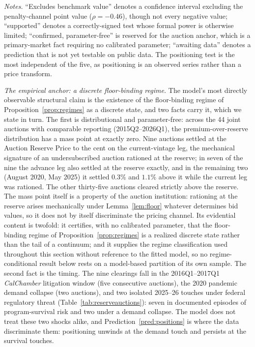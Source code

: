 \documentclass[11pt,letterpaper]{article}
\theoremstyle{plain}
\theoremstyle{definition}
\numberwithin{equation}{section}
\begin{document}
\begin{table}[H]
\smallskip
{\footnotesize\justifying
\textit{Notes.} ``Excludes benchmark value'' denotes a confidence interval excluding the penalty-channel point value ($\rho=-0.46$), though not every negative value; ``supported'' denotes a correctly-signed test whose formal power is otherwise limited; ``confirmed, parameter-free'' is reserved for the auction anchor, which is a primary-market fact requiring no calibrated parameter; ``awaiting data'' denotes a prediction that is not yet testable on public data. The positioning test is the most independent of the five, as positioning is an observed series rather than a price transform.\par}
\end{table}

\emph{The empirical anchor: a discrete floor-binding regime.} The model's most directly observable structural claim is the existence of the floor-binding regime of Proposition~\ref{prop:regimes} as a discrete state, and two facts carry it, which we state in turn. The first is distributional and parameter-free: across the 44 joint auctions with comparable reporting (2015Q2--2026Q1), the premium-over-reserve distribution has a mass point at exactly zero. Nine auctions settled at the Auction Reserve Price to the cent on the current-vintage leg, the mechanical signature of an undersubscribed auction rationed at the reserve; in seven of the nine the advance leg also settled at the reserve exactly, and in the remaining two (August 2020, May 2025) it settled $0.3\%$ and $1.1\%$ above it while the current leg was rationed. The other thirty-five auctions cleared strictly above the reserve. The mass point itself is a property of the auction institution: rationing at the reserve arises mechanically under Lemma~\ref{lem:floor} whatever determines bid values, so it does not by itself discriminate the pricing channel. Its evidential content is twofold: it certifies, with no calibrated parameter, that the floor-binding regime of Proposition~\ref{prop:regimes} is a realized discrete state rather than the tail of a continuum; and it supplies the regime classification used throughout this section without reference to the fitted model, so no regime-conditional result below rests on a model-based partition of its own sample. The second fact is the timing. The nine clearings fall in the 2016Q1--2017Q1 \emph{CalChamber} litigation window (five consecutive auctions), the 2020 pandemic demand collapse (two auctions), and two isolated 2025--26 touches under federal regulatory threat (Table~\ref{tab:reserveauctions}): seven in documented episodes of program-survival risk and two under a demand collapse. The model does not treat these two shocks alike, and Prediction~\ref{pred:positions} is where the data discriminate them: positioning unwinds at the demand touch and persists at the survival touches.
\end{document}
